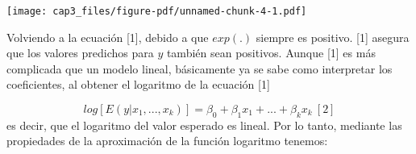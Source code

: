 \documentclass[
  letterpaper,
  DIV=11,
  numbers=noendperiod]{scrreprt}
\newenvironment{Shaded}{\begin{snugshade}}{\end{snugshade}}
\newcommand{\AttributeTok}[1]{\textcolor[rgb]{0.40,0.45,0.13}{#1}}
\newcommand{\DecValTok}[1]{\textcolor[rgb]{0.68,0.00,0.00}{#1}}
\newcommand{\FunctionTok}[1]{\textcolor[rgb]{0.28,0.35,0.67}{#1}}
\newcommand{\NormalTok}[1]{\textcolor[rgb]{0.00,0.23,0.31}{#1}}
\newcommand{\OtherTok}[1]{\textcolor[rgb]{0.00,0.23,0.31}{#1}}
\newcommand{\SpecialCharTok}[1]{\textcolor[rgb]{0.37,0.37,0.37}{#1}}
\newcommand{\StringTok}[1]{\textcolor[rgb]{0.13,0.47,0.30}{#1}}
\begin{document}
\begin{Shaded}
\end{Shaded}

\texttt{[image: cap3\_files/figure-pdf/unnamed-chunk-4-1.pdf]}

Volviendo a la ecuación {[}1{]}, debido a que \(exp(.)\) siempre es
positivo. {[}1{]} asegura que los valores predichos para \(y\) también
sean positivos. Aunque {[}1{]} es más complicada que un modelo lineal,
básicamente ya se sabe como interpretar los coeficientes, al obtener el
logaritmo de la ecuación {[}1{]}

\[log[E(y|x_1,...,x_k)]=\beta_0+\beta_1x_1+...+\beta_kx_k\ [2]\] es
decir, que el logaritmo del valor esperado es lineal. Por lo tanto,
mediante las propiedades de la aproximación de la función logaritmo
tenemos:
\end{document}

